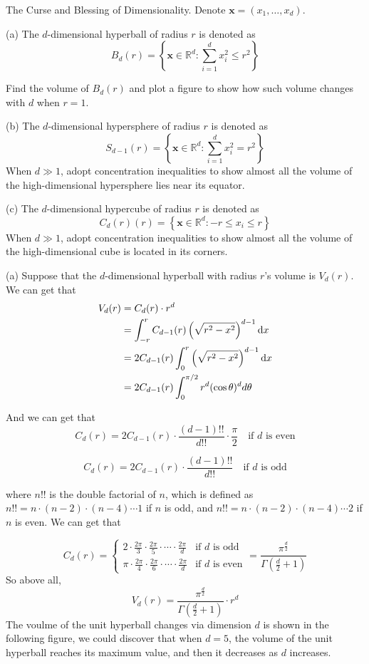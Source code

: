 \begin{homeworkProblem}

The Curse and Blessing of Dimensionality. Denote $\boldsymbol{x}=\left(x_1, \ldots, x_d\right)$.

(a) The $d$-dimensional hyperball of radius $r$ is denoted as
$$B_d(r)=\left\{\boldsymbol{x} \in \mathbb{R}^d: \sum_{i=1}^d x_i^2 \leq r^2\right\}$$

Find the volume of $B_d(r)$ and plot a figure to show how such volume changes with $d$ when $r=1$.

(b) The $d$-dimensional hypersphere of radius $r$ is denoted as
$$S_{d-1}(r)=\left\{\boldsymbol{x} \in \mathbb{R}^d: \sum_{i=1}^d x_i^2=r^2\right\}$$
When $d \gg 1$, adopt concentration inequalities to show almost all the volume of the high-dimensional hypersphere lies near its equator.

(c) The $d$-dimensional hypercube of radius $r$ is denoted as
$$C_d(r)(r)=\left\{\boldsymbol{x} \in \mathbb{R}^d:-r \leq x_i \leq r\right\}$$
When $d \gg 1$, adopt concentration inequalities to show almost all the volume of the high-dimensional cube is located in its corners.

\solution

(a) Suppose that the $d$-dimensional hyperball with radius $r$'s volume is $V_d(r)$. We can get that
\begin{align*}
V_d(r) &= C_d(r) \cdot r^d \\
&= \int_{-r}^r C_{d-1}(r) \left(\sqrt{r^2 - x^2}\right)^{d-1} \mathrm{d}x \\
&= 2C_{d-1}(r) \int_0^r \left(\sqrt{r^2 - x^2}\right)^{d-1} \mathrm{d}x \\
&= 2 C_{d-1}(r) \int_0^{\pi / 2} r^d (\cos\theta)^{d} d\theta
\end{align*}

And we can get that
$$
C_d(r) = 2 C_{d-1}(r) \cdot \frac{(d-1)!!}{d!!} \cdot \frac{\pi}{2} \quad \text{if } d \text{ is even}
$$

$$
C_d(r) = 2 C_{d-1}(r) \cdot \frac{(d-1)!!}{d!!} \quad \text{if } d \text{ is odd}
$$

where $n!!$ is the double factorial of $n$, which is defined as $n!! = n \cdot (n-2) \cdot (n-4) \cdots 1$ if $n$ is odd, and $n!! = n \cdot (n-2) \cdot (n-4) \cdots 2$ if $n$ is even. We can get that

$$
C_d(r) = 
\begin{cases}
2 \cdot \frac{2 \pi}{3} \cdot \frac{2 \pi}{5} \cdot \cdots \cdot \frac{2 \pi}{d} & \text{if } d \text{ is odd} \\
\pi \cdot \frac{2 \pi}{4} \cdot \frac{2 \pi}{6} \cdot \cdots \cdot \frac{2 \pi}{d} & \text{if } d \text{ is even}
\end{cases}
= \frac{\pi^{\frac{d}{2}}}{\Gamma\left(\frac{d}{2} + 1\right)}
$$
So above all,
$$
V_d(r) = \frac{\pi^{\frac{d}{2}}}{\Gamma\left(\frac{d}{2} + 1\right)} \cdot r^d
$$
The voulme of the unit hyperball changes via dimension $d$ is shown in the following figure, we could discover that when $d=5$, the volume of the unit hyperball reaches its maximum value, and then it decreases as $d$ increases.


\end{homeworkProblem}
